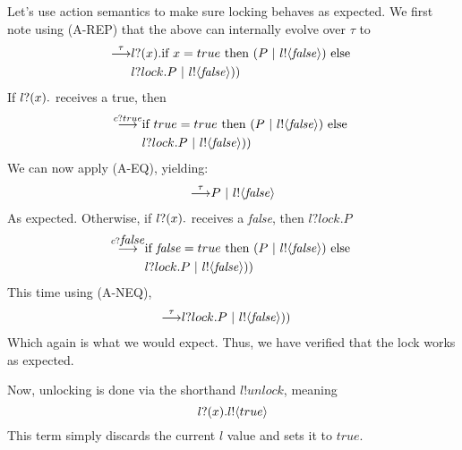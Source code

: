 Let's use action semantics to make sure locking behaves as expected.  
We first note using (A-REP) that the above can internally evolve over $\tau$ to
\begin{equation}\begin{split}
	\overset{{\tau}}{\longrightarrow} & {l}?({x}). \text{if } {x=true}\text{ then }(P\ |\  {l}!\langle{\mbox{\emph{false}}}\rangle)\text{ else }\\
	&l?lock.P \ |\  {l}!\langle{\mbox{\emph{false}}}\rangle))
\end{split}\end{equation}
If ${l}?({x}).$ receives a true, then
\begin{equation}\begin{split}
	\overset{{{c}?{true}}}{\longrightarrow} & \text{if } {true=true}\text{ then }(P\ |\  {l}!\langle{\mbox{\emph{false}}}\rangle)\text{ else }\\
	&l?lock.P \ |\  {l}!\langle{\mbox{\emph{false}}}\rangle))
\end{split}\end{equation}
We can now apply (A-EQ), yielding:
\begin{equation}\begin{split}
	\overset{{\tau}}{\longrightarrow} & P\ |\  {l}!\langle{\mbox{\emph{false}}}\rangle\\
\end{split}\end{equation}
As expected.  Otherwise, if ${l}?({x}).$ receives a \mbox{\emph{false}}, then $l?lock.P$
\begin{equation}\begin{split}
	\overset{{{c}?{\mbox{\emph{false}}}}}{\longrightarrow} & \text{if } {\mbox{\emph{false}}=true}\text{ then }(P\ |\  {l}!\langle{\mbox{\emph{false}}}\rangle)\text{ else }\\
	&l?lock.P \ |\  {l}!\langle{\mbox{\emph{false}}}\rangle))
\end{split}\end{equation}
This time using (A-NEQ),
\begin{equation}\begin{split}
	\overset{{\tau}}{\longrightarrow} &l?lock.P \ |\  {l}!\langle{\mbox{\emph{false}}}\rangle))
\end{split}\end{equation}
Which again is what we would expect.  
Thus, we have verified that the lock works as expected.

Now, unlocking is done via the shorthand $l!unlock$, meaning
\[
	{l}?({x}). {l}!\langle{true}\rangle
\]
This term simply discards the current $l$ value and sets it to $true$.  

